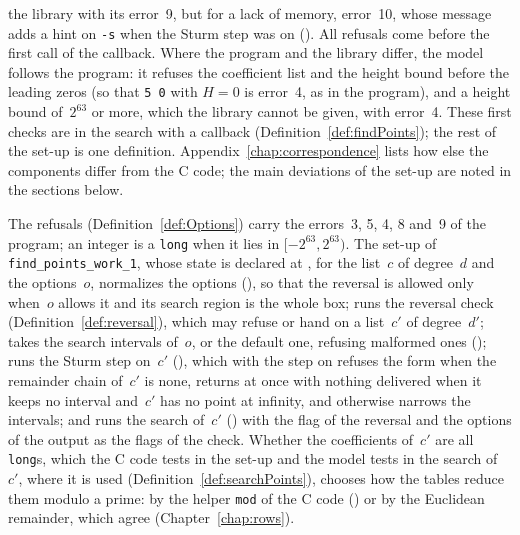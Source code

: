 the library with its error~9, but for a lack of memory, error~10, whose message adds a hint on
\verb|-s| when the Sturm step was on (). All
refusals come before the first call of the callback. Where the program and the library differ, the
model follows the program: it refuses the coefficient list and the height bound before the leading
zeros (so that \verb|5 0| with $H = 0$ is error~4, as in the program), and a height bound
of~$2^{63}$ or more, which the library cannot be given, with error~4. These first checks are in the
search with a callback (Definition~\ref{def:findPoints}); the rest of the set-up is one definition.
Appendix~\ref{chap:correspondence} lists how else the components differ from the C code; the main
deviations of the set-up are noted in the sections below.

\begin{definition}\label{def:setupSearch}
  \leanok
  The refusals (Definition~\ref{def:Options}) carry the errors~3, 5, 4, 8 and~9 of the program; an
  integer is a \verb|long| when it lies in $[-2^{63}, 2^{63})$. The set-up of \verb|find_points_work_1|, whose state is declared at
  , for the list~$c$ of degree~$d$ and the options~$o$,
  normalizes the options (), so that the reversal is allowed only
  when~$o$ allows it and its search region is the whole box; runs the reversal check
  (Definition~\ref{def:reversal}), which may refuse or hand on a list~$c'$ of degree~$d'$; takes
  the search intervals of~$o$, or the default one, refusing malformed ones
  (); runs the Sturm step on~$c'$ (),
  which with the step on refuses the form when the remainder chain of~$c'$ is none, returns at once
  with nothing delivered when it keeps no interval and~$c'$ has no point at infinity, and otherwise
  narrows the intervals; and runs the search of~$c'$ () with the flag
  of the reversal and the options of the output as the flags of the check. Whether the coefficients
  of~$c'$ are all \verb|long|s, which the C code tests in the set-up and the model tests in the
  search of~$c'$, where it is used (Definition~\ref{def:searchPoints}), chooses how the tables
  reduce them modulo a prime: by the helper \verb|mod| of the C code
  () or by the Euclidean remainder, which agree
  (Chapter~\ref{chap:rows}).
\end{definition}

